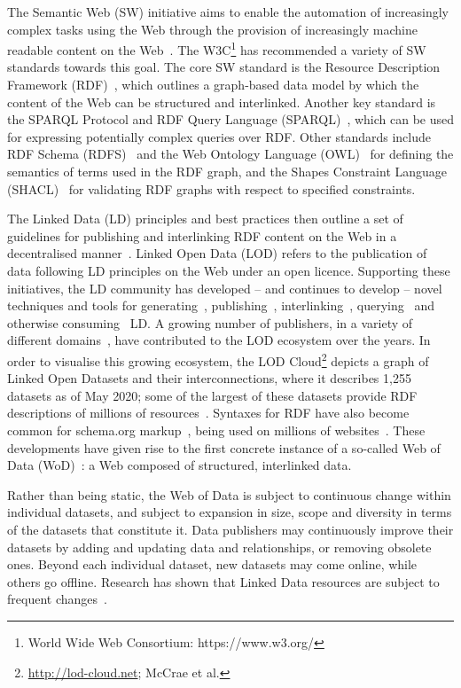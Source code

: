 \documentclass[sw]{iosart2x}
\begin{document}

The Semantic Web (SW) initiative aims to enable the automation of increasingly complex tasks using the Web through the provision of increasingly machine readable content on the Web~\cite{semwebsa}. The W3C\footnote{World Wide Web Consortium: https://www.w3.org/ } has recommended a variety of SW standards towards this goal. The core SW standard is the Resource Description Framework (RDF)~\cite{rdfconcepts11}, which outlines a graph-based data model by which the content of the Web can be structured and interlinked. Another key standard is the SPARQL Protocol and RDF Query Language (SPARQL)~\cite{sparql11}, which can be used for expressing potentially complex queries over RDF. Other standards include RDF Schema (RDFS)~\cite{rdfschema11} and the Web Ontology Language (OWL)~\cite{owl2primer} for defining the semantics of terms used in the RDF graph, and the Shapes Constraint Language (SHACL)~\cite{shacl} for validating RDF graphs with respect to specified constraints.

The Linked Data (LD) principles and best practices then outline a set of guidelines for publishing and interlinking RDF content on the Web in a decentralised manner~\cite{ldbook}. Linked Open Data (LOD) refers to the publication of data following LD principles on the Web under an open licence. Supporting these initiatives, the LD community has developed -- and continues to develop -- novel techniques and tools for generating~\cite{Bizer03,GentileZC15}, publishing~\cite{CorlosquetDCPD09,MaaliCP12}, interlinking~\cite{silk,NgomoA11}, querying~\cite{HartigBF09,VerborghSHHVMHC16} and otherwise consuming~\cite{TummarelloDO07,swsejws} LD. A growing number of publishers, in a variety of different domains~\cite{SchmachtenbergBP14}, have contributed to the LOD ecosystem over the years. In order to visualise this growing ecosystem, the LOD Cloud\footnote{\url{http://lod-cloud.net}; McCrae et al.} depicts a graph of Linked Open Datasets and their interconnections, where it describes 1,255 datasets as of May 2020; some of the largest of these datasets provide RDF descriptions of millions of resources~\cite{ErxlebenGKMV14,dbpedia}. Syntaxes for RDF have also become common for schema.org markup~\cite{schemaorg}, being used on millions of websites~\cite{MeuselPB14}.
These developments have given rise to the first concrete instance of a so-called Web of Data (WoD)~\cite{wodbook}: a Web composed of structured, interlinked data.
\medskip

Rather than being static, the Web of Data is subject to continuous change within individual datasets, and subject to expansion in size, scope and diversity in terms of the datasets that constitute it. Data publishers may continuously improve their datasets by adding and updating data and relationships, or removing obsolete ones. Beyond each individual dataset, new datasets may come online, while others go offline. Research has shown that Linked Data resources are subject to frequent changes~\cite{UmbrichHHPD10, AuerDML12, KaferAUOH13, DividinoSGG13, SchmachtenbergBP14}. 
\end{document}
